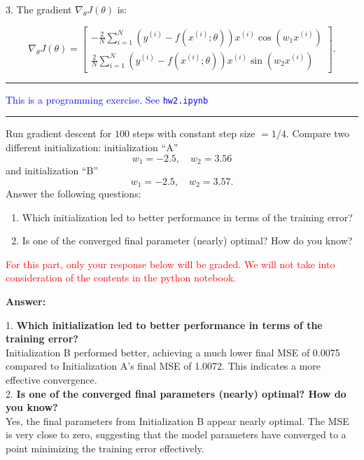 \documentclass{article}
\newcommand{\mydivider}{\vspace{1em}\hrule\vspace{1em}}
\newcommand{\mypart}[2]{\noindent{\textbf{[#1] point(s) --- #2:}}}
\newcommand{\programming}{\textcolor{blue}{This is a programming exercise. See \texttt{hw2.ipynb}}}
\begin{document}
\begin{tcolorbox}
3. \textbf{}
The gradient \(\nabla_\theta J(\theta)\) is:

\[
\nabla_\theta J(\theta) = \begin{bmatrix} -\frac{2}{N} \sum_{i=1}^{N} \left( y^{(i)} - f(x^{(i)}; \theta) \right) x^{(i)} \cos(w_1 x^{(i)}) \\ \frac{2}{N} \sum_{i=1}^{N} \left( y^{(i)} - f(x^{(i)}; \theta) \right) x^{(i)} \sin(w_2 x^{(i)}) \end{bmatrix}.
\]




\end{tcolorbox}
\mydivider

\mypart{1}{part b} \programming

\mydivider

\mypart{4}{part c}
Run gradient descent for \(100\) steps with constant step size \(=1/4\). Compare two different initialization: initialization ``A''
\[
w_{1} = -2.5,\quad
w_{2} = 3.56
\]
and initialization ``B''
\[
w_{1} = -2.5,\quad
w_{2} = 3.57.
\]
Answer the following questions:
\begin{enumerate}
  \item Which initialization led to better performance in terms of the training error?

  \item Is one of the converged final parameter (nearly) optimal? How do you know?
\end{enumerate}

\textcolor{red}{For this part, only your response below will be graded. We will not take into consideration of the contents in the python notebook.}
\begin{tcolorbox}
\textbf{Answer: }


1. \textbf{Which initialization led to better performance in terms of the training error?} \\
\[\]
Initialization B performed better, achieving a much lower final MSE of 0.0075 compared to Initialization A's final MSE of 1.0072. This indicates a more effective convergence.
\[\]
2. \textbf{Is one of the converged final parameters (nearly) optimal? How do you know?} \\
\[\]
Yes, the final parameters from Initialization B appear nearly optimal. The MSE is very close to zero, suggesting that the model parameters have converged to a point minimizing the training error effectively.


\end{tcolorbox}
\end{document}
